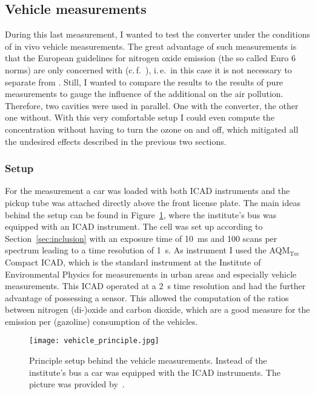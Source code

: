 \subsection{Vehicle measurements}
\label{sec:vehicle}

During this last measurement, I wanted to test the converter under the
conditions of in vivo vehicle measurements. The great advantage of
such measurements is that the European guidelines for nitrogen oxide
emission (the so called Euro 6 norms) are only concerned with
 (c.\,f.~\cite{eu}), i.\,e.\ in this case it is not necessary
to separate  from . Still, I wanted to compare the
 results to the results of pure  measurements to
gauge the influence of the additional  on the air
pollution. Therefore, two cavities were used in parallel. One with the
converter, the other one without. With this very comfortable setup I
could even compute the  concentration without having to turn
the ozone on and off, which mitigated all the undesired effects
described in the previous two sections.

\subsubsection{Setup}
\label{sec:vehicle-setup}

For the measurement a car was loaded with both ICAD instruments and
the pickup tube was attached directly above the front license
plate. The main ideas behind the setup can be found in
Figure~\ref{fig:hd-principle}, where the institute's bus was equipped
with an ICAD instrument. The  cell was set up according to
Section~\ref{sec:inclusion} with an exposure time of
\SI{10}{\milli\second} and 100 scans per spectrum leading to a time
resolution of \SI{1}{\second}. As  instrument I used the
AQM$_{\text{Tec}}$ Compact ICAD, which is the standard instrument at
the Institute of Environmental Physics for  measurements in
urban areas and especially vehicle measurements. This  ICAD
operated at a \SI{2}{\second} time resolution and had the further
advantage of possessing a  sensor. This allowed the
computation of the ratios between nitrogen (di-)oxide and carbon
dioxide, which are a good measure for the emission per (gazoline)
consumption of the vehicles.

\begin{figure}[htbp]
  \centering
  \texttt{[image: vehicle\_principle.jpg]}
  \caption{Principle setup behind the vehicle measurements. Instead of
    the institute's bus a car was equipped with the ICAD
    instruments. The picture was provided by~\cite{denis}.}
  \label{fig:hd-principle}
\end{figure}

